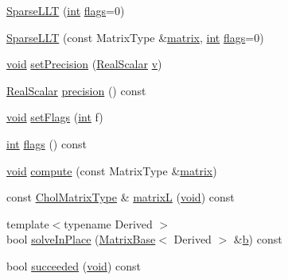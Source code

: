 \begin{DoxyCompactItemize}
\item 
\hyperlink{class_sparse_l_l_t_a0c780d923d4a24d3601582e290690f9f}{Sparse\-L\-L\-T} (\hyperlink{ioapi_8h_a787fa3cf048117ba7123753c1e74fcd6}{int} \hyperlink{class_sparse_l_l_t_a7649229f826139f5c457f91e1fc996ce}{flags}=0)
\item 
\hyperlink{class_sparse_l_l_t_a2c2dc82f332c1f3ac38e41197d5d9030}{Sparse\-L\-L\-T} (const Matrix\-Type \&\hyperlink{glext_8h_a7b24a3f2f56eb1244ae69dacb4fecb6f}{matrix}, \hyperlink{ioapi_8h_a787fa3cf048117ba7123753c1e74fcd6}{int} \hyperlink{class_sparse_l_l_t_a7649229f826139f5c457f91e1fc996ce}{flags}=0)
\item 
\hyperlink{group___u_a_v_objects_plugin_ga444cf2ff3f0ecbe028adce838d373f5c}{void} \hyperlink{class_sparse_l_l_t_a9740bcf385dcc716b57867bc4886b886}{set\-Precision} (\hyperlink{class_sparse_l_l_t_a20661706ee54d830837a844d675fb236}{Real\-Scalar} \hyperlink{glext_8h_a14cfbe2fc2234f5504618905b69d1e06}{v})
\item 
\hyperlink{class_sparse_l_l_t_a20661706ee54d830837a844d675fb236}{Real\-Scalar} \hyperlink{class_sparse_l_l_t_a82edfc53f929a6d479776ca3baae2f33}{precision} () const 
\item 
\hyperlink{group___u_a_v_objects_plugin_ga444cf2ff3f0ecbe028adce838d373f5c}{void} \hyperlink{class_sparse_l_l_t_aca74358328bcc011555f0526637f3edf}{set\-Flags} (\hyperlink{ioapi_8h_a787fa3cf048117ba7123753c1e74fcd6}{int} f)
\item 
\hyperlink{ioapi_8h_a787fa3cf048117ba7123753c1e74fcd6}{int} \hyperlink{class_sparse_l_l_t_a7649229f826139f5c457f91e1fc996ce}{flags} () const 
\item 
\hyperlink{group___u_a_v_objects_plugin_ga444cf2ff3f0ecbe028adce838d373f5c}{void} \hyperlink{class_sparse_l_l_t_a5aa2a89c9b9885ac4a4443a8bbe9582a}{compute} (const Matrix\-Type \&\hyperlink{glext_8h_a7b24a3f2f56eb1244ae69dacb4fecb6f}{matrix})
\item 
const \hyperlink{class_sparse_l_l_t_a2c9d9dfe18d1e70b0f46de8c9d106bf2}{Chol\-Matrix\-Type} \& \hyperlink{class_sparse_l_l_t_a5ce295ba0a4ec6182bd0f7bdd6d9e0a3}{matrix\-L} (\hyperlink{group___u_a_v_objects_plugin_ga444cf2ff3f0ecbe028adce838d373f5c}{void}) const 
\item 
{\footnotesize template$<$typename Derived $>$ }\\bool \hyperlink{class_sparse_l_l_t_abef39ed2b3ad4266bf364d504bbf34ed}{solve\-In\-Place} (\hyperlink{class_matrix_base}{Matrix\-Base}$<$ Derived $>$ \&\hyperlink{glext_8h_a6eba317e3cf44d6d26c04a5a8f197dcb}{b}) const 
\item 
bool \hyperlink{class_sparse_l_l_t_a150e2f7c8ea43bd908a4819b0c2e7e3d}{succeeded} (\hyperlink{group___u_a_v_objects_plugin_ga444cf2ff3f0ecbe028adce838d373f5c}{void}) const 
\end{DoxyCompactItemize}
